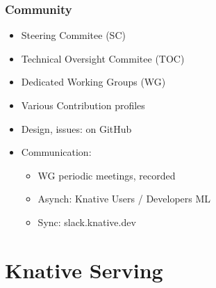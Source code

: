 \documentclass[aspectratio=169,11pt,hyperref={colorlinks=true}]{beamer}
\begin{document}
\begin{lblackrwhiteframe}
\begin{grayframe}
  \frametitle{Community}
  \begin{itemize}
    \item Steering Commitee (SC)
    \item Technical Oversight Commitee (TOC)
    \item Dedicated Working Groups (WG)
    \item Various Contribution profiles
    \item Design, issues: on GitHub
    \item Communication:
    \begin{itemize}
      \item WG periodic meetings, recorded
      \item Asynch: Knative Users / Developers ML
      \item Sync: slack.knative.dev
    \end{itemize}
  \end{itemize}
\end{grayframe}

\section{Knative Serving}

\end{lblackrwhiteframe}
\end{document}
